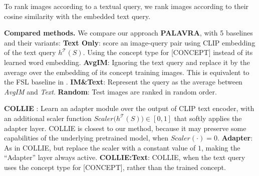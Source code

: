 \documentclass[runningheads]{llncs}
\newcommand\edit[1]{#1}
\newcommand{\CLIPT}{h^{\mathcal{T}}}
\newcommand{\concept}{[CONCEPT]}
\begin{document}
To rank images according to a textual query, we rank images according to their cosine similarity with the embedded text query.

\noindent\textbf{Compared methods. }\label{sec_comp_methods_retrieval} We compare our approach \textbf{PALAVRA}, with 5 baselines and their variants: \textbf{Text Only}: score an image-query pair using CLIP embedding of the text query $\CLIPT(S)$. Using the concept type for \concept{} instead of its learned word embedding.
\textbf{AvgIM}: \edit{Ignoring the text query and replace it} by the average over the embedding of its concept training images. \edit{This is equivalent to the FSL baseline in \cite{chen2021meta}.}
\textbf{IM\&Text}: Represent the query as the average between \hfill \textit{AvgIM} \hfill and \textit{Text}. \hfill  \textbf{Random}: Test \hfill images \hfill are \hfill ranked \hfill in  \hfill  random  \hfill order. 

\textbf{COLLIE} \cite{skantze2021collie}:
 Learn an adapter module over the output of CLIP text encoder, with an additional scaler function $Scaler\big(\CLIPT(S)\big) \in [0,1]$ that softly applies the adapter layer. COLLIE is closest to our method, because it may preserve some capabilities of the underlying pretrained model, when $Scaler(\cdot)=0$.
\textbf{Adapter}: As in COLLIE, but replace the scaler with a constant value of $1$, 
 making the ``Adapter'' layer always active.
\textbf{COLLIE:Text}: COLLIE, when the text query uses the concept type for \concept{}, rather than the trained concept.
\end{document}
